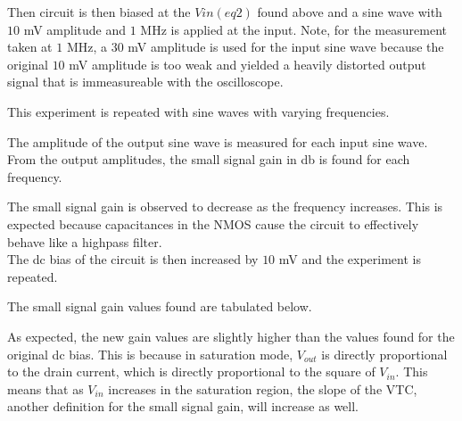 Then circuit is then biased at the $V{in(eq2)}$ found above and a sine wave with $10$ \si{\milli\volt} amplitude and $1$ \si{\mega\hertz} is applied at the input. Note, for the measurement taken at $1$ \si{\mega\hertz}, a $30$ \si{\milli\volt} amplitude is used for the input sine wave because the original $10$ \si{\milli\volt} amplitude is too weak and yielded a heavily distorted output signal that is immeasureable with the oscilloscope.

\FloatBarrier


\FloatBarrier

This experiment is repeated with sine waves with varying frequencies.

\FloatBarrier


\FloatBarrier

The amplitude of the output sine wave is measured for each input sine wave. 
From the output amplitudes, the small signal gain in \si{\decibel} is found for each frequency.

\FloatBarrier

\begin{table}[h!]
	\centering
	\caption{Gain of Common Source Amplifier}
	\label{tab:gain_part2}
\end{table}

\FloatBarrier

The small signal gain is observed to decrease as the frequency increases.
This is expected because capacitances in the NMOS cause the circuit to effectively behave like a highpass filter. \\

The dc bias of the circuit is then increased by $10$ \si{\milli\volt} and the experiment is repeated.


The small signal gain values found are tabulated below.

\FloatBarrier

\begin{table}[h!]
	\centering
	\caption{Gain of Common Source Amplifier with $10$ \si{\milli\volt} Higher Bias}
	\label{tab:gain_part2}
\end{table}

\FloatBarrier

As expected, the new gain values are slightly higher than the values found for the original dc bias.
This is because in saturation mode, $V_{out}$ is directly proportional to the drain current, which is directly proportional to the square of $V_{in}$. This means that as $V_{in}$ increases in the saturation region, the slope of the VTC, another definition for the small signal gain, will increase as well. \\
